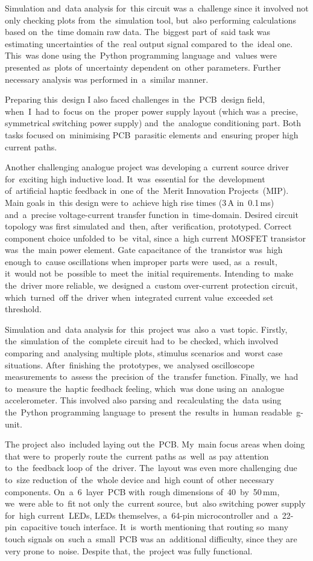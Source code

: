 \documentclass[11pt,a4paper,sans]{article}
\begin{document}
	Simulation and~data analysis for~this circuit was a~challenge since it involved not only
	checking plots from~the~simulation tool, but~also performing calculations based on~the~time 
	domain raw data. The~biggest part of~said task was estimating uncertainties of~the~real output 
	signal compared to~the~ideal one. This~was done using the~Python programming language
	and~values were presented as~plots of~uncertainty dependent on~other parameters. Further 
	necessary analysis was performed in~a~similar manner.
	
	Preparing this~design I also faced challenges in~the~PCB~design field, when~I~had 
	to~focus on~the~proper power supply layout (which was a~precise, symmetrical
	switching power supply) and~the~analogue conditioning part. Both tasks focused on~minimising 
	PCB~parasitic elements and~ensuring proper high current paths.
	
	Another challenging analogue project was developing a~current source driver for~exciting
	high inductive load. It~was~essential for~the~development of~artificial haptic feedback
	in~one of~the~Merit Innovation Projects~(MIP). Main goals in~this design were to~achieve 
	high rise times (3$\,$A in~0.1$\,$ms) and~a~precise voltage-current transfer function  
	in~time-domain. 
	Desired circuit	topology was first simulated and~then, after~verification, prototyped.  
	Correct component choice unfolded to~be~vital, since a~high current MOSFET transistor 
	was~the~main power 
	element. Gate capacitance of~the~transistor was~high enough to~cause oscillations when improper 
	parts were~used, as~a~result, it~would not be~possible to~meet the~initial requirements. 
	Intending to~make the~driver more reliable, we~designed a~custom 
	over-current protection circuit, which~turned~off the~driver when~integrated current 
	value~exceeded set threshold.
	
	Simulation and~data analysis for~this~project was~also a~vast topic. Firstly, the~simulation
	of~the~complete circuit had to~be checked, which involved comparing and~analysing multiple 
	plots, stimulus scenarios and~worst case situations. After~finishing the~prototypes, we~analysed
	oscilloscope measurements to~assess the~precision of~the~transfer function.
	Finally, we~had to~measure the~haptic feedback feeling, which~was done using an~analogue
	accelerometer. This involved also parsing and~recalculating the~data using the~Python 
	programming	language to~present the~results in~human readable~g-unit.
	
	The project also~included laying out the~PCB. My~main focus areas when doing that were 
	to~properly
	route the~current paths as~well~as pay attention to~the~feedback loop of~the~driver.
	The~layout was even more challenging due to~size reduction of~the~whole device and~high count 
	of~other necessary components. On~a~6~layer~PCB with~rough dimensions of~40~by~50$\,$mm, we~were
	able to~fit not only the~current source, but~also switching power supply for~high current~LEDs,
	LEDs themselves, a~64-pin microcontroller and~a~\mbox{22-pin}~capacitive touch interface. 
	It~is~worth
	mentioning that routing so~many touch signals on~such a~small~PCB was an~additional difficulty,
	since they are very prone to~noise. Despite that, the~project was fully functional.
	
\end{document}
